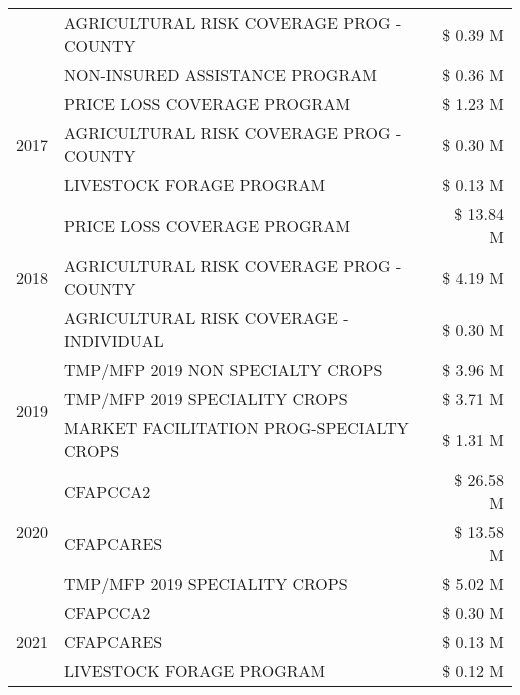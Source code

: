\begin{tabular}{llr}
 & AGRICULTURAL RISK COVERAGE PROG - COUNTY      & \$ 0.39 M \\
 & NON-INSURED ASSISTANCE PROGRAM                & \$ 0.36 M \\
\cline{1-3}
\multirow[t]{3}{*}{2017} & PRICE LOSS COVERAGE PROGRAM & \$ 1.23 M \\
 & AGRICULTURAL RISK COVERAGE PROG - COUNTY & \$ 0.30 M \\
 & LIVESTOCK FORAGE PROGRAM & \$ 0.13 M \\
\cline{1-3}
\multirow[t]{3}{*}{2018} & PRICE LOSS COVERAGE PROGRAM & \$ 13.84 M \\
 & AGRICULTURAL RISK COVERAGE PROG - COUNTY & \$ 4.19 M \\
 & AGRICULTURAL RISK COVERAGE - INDIVIDUAL & \$ 0.30 M \\
\cline{1-3}
\multirow[t]{3}{*}{2019} & TMP/MFP 2019 NON SPECIALTY CROPS & \$ 3.96 M \\
 & TMP/MFP 2019 SPECIALITY CROPS & \$ 3.71 M \\
 & MARKET FACILITATION PROG-SPECIALTY CROPS & \$ 1.31 M \\
\cline{1-3}
\multirow[t]{3}{*}{2020} & CFAPCCA2 & \$ 26.58 M \\
 & CFAPCARES & \$ 13.58 M \\
 & TMP/MFP 2019 SPECIALITY CROPS & \$ 5.02 M \\
\cline{1-3}
\multirow[t]{3}{*}{2021} & CFAPCCA2 & \$ 0.30 M \\
 & CFAPCARES & \$ 0.13 M \\
 & LIVESTOCK FORAGE PROGRAM & \$ 0.12 M \\
\cline{1-3}
\bottomrule
\end{tabular}
